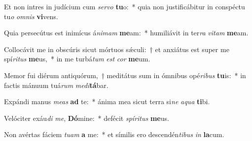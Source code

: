 \item Et non intres in judícium cum \textit{ser}\textit{vo} \textbf{tu}o:~* quia non justificábitur in conspéctu tu\textit{o} \textit{om}\textit{nis} \textbf{vi}vens.
\item Quia persecútus est inimícus á\textit{ni}\textit{mam} \textbf{me}am:~* humiliávit in ter\textit{ra} \textit{vi}\textit{tam} \textbf{me}am.
\item Collocávit me in obscúris sicut mórtuos sǽculi:~† et anxiátus est super me spí\textit{ri}\textit{tus} \textbf{me}us,~* in me turbá\textit{tum} \textit{est} \textit{cor} \textbf{me}um.
\item Memor fui diérum antiquórum,~† meditátus sum in ómnibus opé\textit{ri}\textit{bus} \textbf{tu}is:~* in factis mánuum tuá\textit{rum} \textit{me}\textit{di}\textbf{tá}bar.
\item Expándi manus \textit{me}\textit{as} \textbf{ad} te:~* ánima mea sicut terra si\textit{ne} \textit{a}\textit{qua} \textbf{ti}bi.
\item Velóciter exáu\textit{di} \textit{me}, \textbf{Dó}mine:~* defécit \textit{spí}\textit{ri}\textit{tus} \textbf{me}us.
\item Non avértas fáciem \textit{tu}\textit{am} \textbf{a} me:~* et símilis ero descendén\textit{ti}\textit{bus} \textit{in} \textbf{la}cum.
